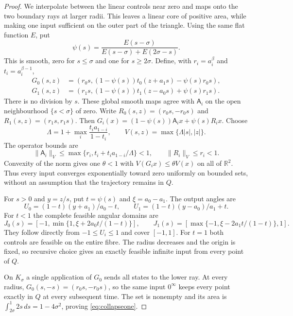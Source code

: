 \documentclass[11pt]{amsart}
\theoremstyle{definition}
\theoremstyle{remark}
\newcommand{\R}{\mathbb R}
\numberwithin{equation}{section}
\begin{document}
\begin{proof}
We interpolate between the linear controls near zero and maps
onto the two boundary rays at larger radii. This leaves a linear
core of positive area, while making one input sufficient on the
outer part of the triangle. Using the same flat function $E$, put
\[
\psi(s)=\frac{E(s-\sigma)}{E(s-\sigma)+E(2\sigma-s)}.
\]
This is smooth, zero for $s\le\sigma$ and one for $s\ge2\sigma$.
Define, with $r_i=a_i^\beta$ and $t_i=a_i^{\beta-1}$,
\begin{equation}\label{eq:collapse}
\begin{split}
G_0(s,z)&=(r_0s,(1-\psi(s))t_0(z+a_1s)-\psi(s)r_0s),\\
G_1(s,z)&=(r_1s,(1-\psi(s))t_1(z-a_0s)+\psi(s)r_1s).
\end{split}
\end{equation}
There is no division by $s$. These global smooth maps agree with
$\mathsf A_i$ on the open neighbourhood $\{s<\sigma\}$ of zero.
Write $R_0(s,z)=(r_0s,-r_0s)$ and $R_1(s,z)=(r_1s,r_1s)$.
Then $G_i(x)=(1-\psi(s))\mathsf A_ix+\psi(s)R_ix$.
Choose
\[
\Lambda=1+\max_i\frac{t_i a_{1-i}}{1-t_i},\qquad
V(s,z)=\max\{\Lambda|s|,|z|\}.
\]
The operator bounds are
\[
\|\mathsf A_i\|_V\le
 \max\{r_i,t_i+t_i a_{1-i}/\Lambda\}<1,
\qquad \|R_i\|_V\le r_i<1.
\]
Convexity of the norm gives one $\theta<1$ with
$V(G_ix)\le\theta V(x)$ on all of $\R^2$. Thus every input
converges exponentially toward zero uniformly on bounded sets,
without an assumption that the trajectory remains in $Q$.

For $s>0$ and $y=z/s$, put $t=\psi(s)$ and $\xi=a_0-a_1$.
The output angles are
\[
U_0=(1-t)(y+a_1)/a_0-t,\qquad
U_1=(1-t)(y-a_0)/a_1+t.
\]
For $t<1$ the complete feasible angular domains are
\[
J_0(s)=\left[-1,\min\{1,\xi+2a_0t/(1-t)\}\right],\qquad
J_1(s)=\left[\max\{-1,\xi-2a_1t/(1-t)\},1\right].
\]
They follow directly from $-1\le U_i\le1$ and cover $[-1,1]$.
For $t=1$ both controls are feasible on the entire fibre.
The radius decreases and the origin is fixed, so recursive choice
gives an exactly feasible infinite input from every point of $Q$.

On $K_\sigma$ a single application of $G_0$ sends all states
to the lower ray. At every radius,
$G_0(s,-s)=(r_0s,-r_0s)$, so the same input $0^\infty$
keeps every point exactly in $Q$ at every subsequent time.
The set is nonempty and its area is
$\int_{2\sigma}^1 2s\,ds=1-4\sigma^2$, proving
\eqref{eq:collapseone}.


\end{proof}
\end{document}
